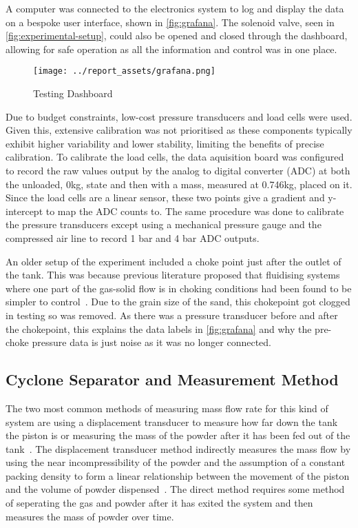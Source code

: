A computer was connected to the electronics system to log and display the data on a bespoke user interface, shown in \autoref{fig:grafana}. The solenoid valve, seen in \autoref{fig:experimental-setup}, could also be opened and closed through the dashboard, allowing for safe operation as all the information and control was in one place.
\begin{figure}[htbp]
    \centering

    \begin{minipage}{0.95\textwidth}
        \centering
        \texttt{[image: ../report\_assets/grafana.png]}
        \caption{Testing Dashboard}\label{fig:grafana}
    \end{minipage}

\end{figure}
Due to budget constraints, low-cost pressure transducers and load cells were used. Given this, extensive calibration was not prioritised as these components typically exhibit higher variability and lower stability, limiting the benefits of precise calibration. To calibrate the load cells, the data aquisition board was configured to record the raw values output by the analog to digital converter (ADC) at both the unloaded, 0kg, state and then with a mass, measured at 0.746kg, placed on it. Since the load cells are a linear sensor, these two points give a gradient and y-intercept to map the ADC counts to. The same procedure was done to calibrate the pressure transducers except using a mechanical pressure gauge and the compressed air line to record 1 bar and 4 bar ADC outputs.

An older setup of the experiment included a choke point just after the outlet of the tank. This was because previous literature proposed that fluidising systems where one part of the gas-solid flow is in choking conditions had been found to be simpler to control~\cite{SUN201630}. Due to the grain size of the sand, this chokepoint got clogged in testing so was removed. As there was a pressure transducer before and after the chokepoint, this explains the data labels in \autoref{fig:grafana} and why the pre-choke pressure data is just noise as it was no longer connected.

\subsection{Cyclone Separator and Measurement Method}
The two most common methods of measuring mass flow rate for this kind of system are using a displacement transducer to measure how far down the tank the piston is or measuring the mass of the powder after it has been fed out of the tank~\cite{SUN201630}\cite{LI2021712}\cite{Tang22}. The displacement transducer method indirectly measures the mass flow by using the near incompressibility of the powder and the assumption of a constant packing density to form a linear relationship between the movement of the piston and the volume of powder dispensed~\cite{SUN201630}. The direct method requires some method of seperating the gas and powder after it has exited the system and then measures the mass of powder over time. 


